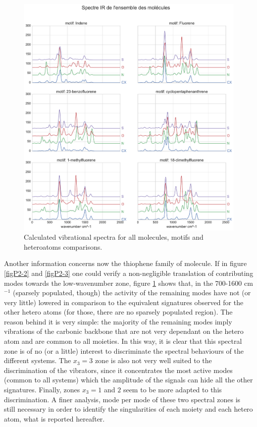 	
	\begin{figure}[H]
		\begin{center}
			\includegraphics[scale=0.5]{image/P2-4}
		\end{center}
		\caption{Calculated vibrational spectra for all molecules, motifs and heteroatoms comparisons. }  \label{figP2-4}
	\end{figure}
	
Another information concerns now the thiophene family of molecule. If in figure \ref{figP2-2} and \ref{figP2-3} one could verify a non-negligible translation of contributing modes towards the low-wavenumber zone, figure \ref{figP2-4} shows that, in the 700-1600 cm$^{-1}$ (sparsely populated, though) the activity of the remaining modes have not (or very little) lowered in comparison to the equivalent signatures observed for the other hetero atoms (for those, there are no sparsely populated region). The reason behind it is very simple: the majority of the remaining modes imply vibrations of the carbonic backbone that are not very dependant on the hetero atom and are common to all moieties. In this way, it is clear that this spectral zone is of no (or a little) interest to discriminate the spectral behaviours of the different systems. The $x_3=3$ zone is also not very well suited to the discrimination of the vibrators, since it concentrates the most active modes (common to all systems) which the amplitude of the signals can hide all the other signatures. Finally, zones $x_3=1$ and $2$ seem to be more adapted to this discrimination. A finer analysis, mode per mode of these two spectral zones is still necessary in order to identify the singularities of each moiety and each hetero atom, what is reported hereafter.


